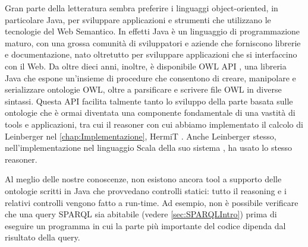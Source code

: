 Gran parte della letteratura sembra preferire i linguaggi object-oriented, in particolare Java, per sviluppare applicazioni e strumenti che utilizzano le tecnologie del Web Semantico. In effetti Java è un linguaggio di programmazione maturo, con una grossa comunità di sviluppatori e aziende che forniscono librerie e documentazione, nato oltretutto per sviluppare applicazioni che si interfaccino con il Web. Da oltre dieci anni, inoltre, è disponibile OWL API \cite{OWLAPI}, una libreria Java che espone un'insieme di procedure che consentono di creare, manipolare e serializzare ontologie OWL, oltre a parsificare e scrivere file OWL in diverse sintassi. Questa API facilita talmente tanto lo sviluppo della parte basata sulle ontologie che è ormai diventata una componente fondamentale di una vastità di tools e applicazioni, tra cui il reasoner con cui abbiamo implementato il calcolo di Leinberger nel \autoref{chap:Implementazione}, HermiT \cite{HermiTWhitepaper}. Anche Leinberger stesso, nell'implementazione nel linguaggio Scala \cite{odersky2004scala} della suo sistema \cite{leinbergerScalaImpl}, ha usato lo stesso reasoner.  

Al meglio delle nostre conoscenze, non esistono ancora tool a supporto delle ontologie scritti in Java che provvedano controlli statici: tutto il reasoning e i relativi controlli vengono fatto a run-time. Ad esempio, non è possibile verificare che una query SPARQL sia abitabile (vedere \autoref{sec:SPARQLIntro}) prima di eseguire un programma in cui la parte più importante del codice dipenda dal risultato della query.

